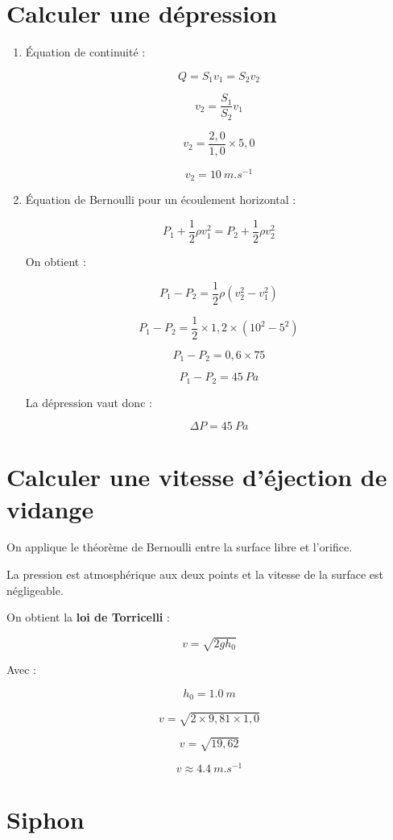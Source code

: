 \documentclass[a4paper,11pt,fleqn]{scrartcl}%
\begin{document}
\section{Calculer une dépression}

\begin{enumerate}

\item Équation de continuité :

\[
Q = S_1 v_1 = S_2 v_2
\]

\[
v_2 = \frac{S_1}{S_2} v_1
\]

\[
v_2 = \frac{2,0}{1,0} \times 5,0
\]

\[
v_2 = \SI{10}{m.s^{-1}}
\]

\item Équation de Bernoulli pour un écoulement horizontal :

\[
P_1 + \frac12 \rho v_1^2 = P_2 + \frac12 \rho v_2^2
\]

On obtient :

\[
P_1 - P_2 = \frac12 \rho (v_2^2 - v_1^2)
\]

\[
P_1 - P_2 = \frac12 \times 1,2 \times (10^2 - 5^2)
\]

\[
P_1 - P_2 = 0,6 \times 75
\]

\[
P_1 - P_2 = \SI{45}{Pa}
\]

La dépression vaut donc :

\[
\Delta P = \SI{45}{Pa}
\]

\end{enumerate}

\section{Calculer une vitesse d'éjection de vidange}

On applique le théorème de Bernoulli entre la surface libre et l'orifice.

La pression est atmosphérique aux deux points et la vitesse de la surface est négligeable.

On obtient la \textbf{loi de Torricelli} :

\[
v = \sqrt{2 g h_0}
\]

Avec :

\[
h_0=\SI{1,0}{m}
\]

\[
v = \sqrt{2\times 9,81 \times 1,0}
\]

\[
v = \sqrt{19,62}
\]

\[
v \approx \SI{4,4}{m.s^{-1}}
\]

\section{Siphon}
\end{document}

